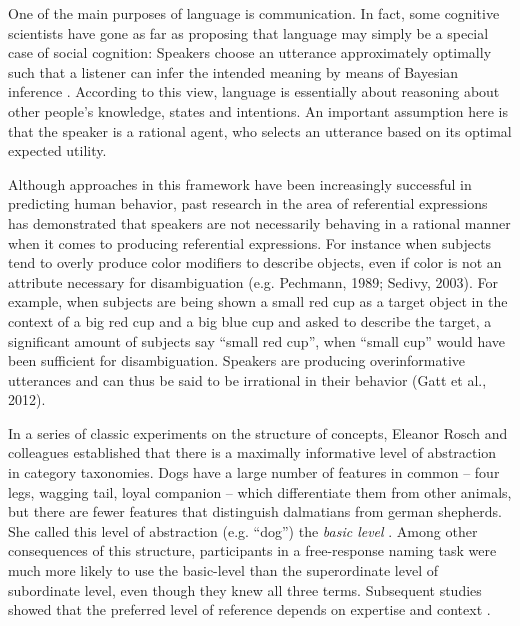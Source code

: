 \documentclass[10pt,letterpaper]{article}
\begin{document}
One of the main purposes of language is communication. In fact, some cognitive scientists have gone as far as proposing that language may simply be a special case of social cognition: Speakers choose an utterance approximately optimally such that a listener can infer the intended meaning by means of Bayesian inference \cite{frank2012}. According to this view, language is essentially about reasoning about other people's knowledge, states and intentions. An important assumption here is that the speaker is a rational agent, who selects an utterance based on its optimal expected utility. 

Although approaches in this framework have been increasingly successful in predicting human behavior, past research in the area of referential expressions has demonstrated that speakers are not necessarily behaving in a rational manner when it comes to producing referential expressions. For instance when subjects tend to overly produce color modifiers to describe objects, even if color is not an attribute necessary for disambiguation (e.g. Pechmann, 1989; Sedivy, 2003). For example, when subjects are being shown a small red cup as a target object in the context of a big red cup and a big blue cup and asked to describe the target, a significant amount of subjects say ``small red cup'', when ``small cup'' would have been sufficient for disambiguation. Speakers are producing overinformative utterances and can thus be said to be irrational in their behavior (Gatt et al., 2012). 

In a series of classic experiments on the structure of concepts, Eleanor Rosch and colleagues established that there is a maximally informative level of abstraction in category taxonomies. Dogs have a large number of features in common -- four legs, wagging tail, loyal companion -- which differentiate them from other animals, but there are fewer features that distinguish dalmatians from german shepherds. She called this level of abstraction (e.g. ``dog'') the \emph{basic level} \cite{RoschEtAl76_BasicLevel}. Among other consequences of this structure, participants in a free-response naming task were much more likely to use the basic-level than the superordinate level of subordinate level, even though they knew all three terms. Subsequent studies showed that the preferred level of reference depends on expertise \cite{TanakaTaylor91_BasicLevelAndExpertise} and context \cite{JohnHampsonGoldbert91_BasicLevelPersonality}.
\end{document}
